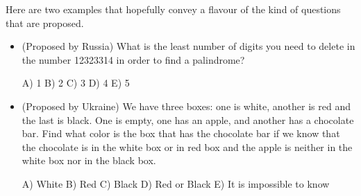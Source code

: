 \documentclass[submission,copyright,creativecommons]{eptcs}
\begin{document}
Here are two examples that hopefully convey a flavour of the kind of
questions that are proposed.
{\small
\begin{itemize}
\item[]
(Proposed by Russia) What is the least number of digits you need to delete
in the number 12323314 in order to find a palindrome?

   A) 1 B) 2 C) 3 D) 4 E) 5

\item[]
(Proposed by Ukraine) We have three boxes: one is white, another is red and
the last is black. One is empty, one has an apple, and another has a chocolate
bar. Find what color is the box that has the chocolate bar if we know that
the chocolate is in the white box or in red box and the apple is neither in
the white box nor in the black box.

A) White B) Red C) Black D) Red or Black E) It is impossible to know
\end{itemize}
}



\nocite{*}

%

\end{document}
